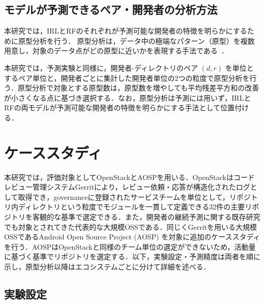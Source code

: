 \documentclass[submit]{ipsj}
\begin{document}
\subsection{モデルが予測できるペア・開発者の分析方法}

本研究では，IRLとRFのそれぞれが予測可能な開発者の特徴を明らかにするために原型分析を行う．
原型分析は，データ中の極端なパターン（原型）を複数用意し，対象のデータ点がどの原型に近いかを表現する手法である~\cite{cutler_breiman}．

本研究では，予測実験と同様に，開発者-ディレクトリのペア $(d, r)$ を単位とするペア単位と，開発者ごとに集計した開発者単位の2つの粒度で原型分析を行う．原型分析で対象とする原型数は，原型数を増やしても平均残差平方和の改善が小さくなる点に基づき選択する．なお，原型分析は予測には用いず，IRLとRFの両モデルが予測可能な開発者の特徴を明らかにする手法として位置付ける．




\section{ケーススタディ}\label{sec:case}
 本研究では，評価対象としてOpenStackとAOSPを用いる．OpenStackはコードレビュー管理システムGerritにより，レビュー依頼・応答が構造化されたログとして取得でき，governanceに登録されたサービスチームを単位として，リポジトリ内ディレクトリという粒度でモジュールを一貫して定義できる32件の主要リポジトリを客観的な基準で選定できる．また，開発者の継続予測に関する既存研究\cite{zhou}\cite{bao}\cite{constantinou}でも対象とされてきた代表的な大規模OSSである．同じくGerritを用いる大規模OSSであるAndroid Open Source Project (AOSP) を対象に追加のケーススタディを行う．AOSPはOpenStackと同様のチーム単位の選定ができないため，活動量に基づく基準でリポジトリを選定する．以下，実験設定・予測精度は両者を順に示し，原型分析以降はエコシステムごとに分けて詳細を述べる．
\vspace{-2mm}
\subsection{実験設定}
\end{document}
